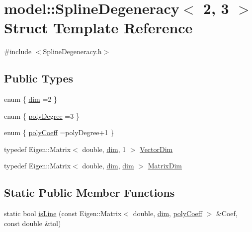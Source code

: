 \hypertarget{structmodel_1_1_spline_degeneracy_3_012_00_013_01_4}{}\section{model\+:\+:Spline\+Degeneracy$<$ 2, 3 $>$ Struct Template Reference}
\label{structmodel_1_1_spline_degeneracy_3_012_00_013_01_4}


{\ttfamily \#include $<$Spline\+Degeneracy.\+h$>$}

\subsection*{Public Types}
\begin{DoxyCompactItemize}
\item 
enum \{ \hyperlink{structmodel_1_1_spline_degeneracy_3_012_00_013_01_4_ab261b00b6647c6651df54f8b5782b963a854d40142847ac96977858cda94bc597}{dim} =2
 \}
\item 
enum \{ \hyperlink{structmodel_1_1_spline_degeneracy_3_012_00_013_01_4_abbd4d2928354009f5cbbaeef2e2c7752a86eb298928bd38a88853ded6be7e0500}{poly\+Degree} =3
 \}
\item 
enum \{ \hyperlink{structmodel_1_1_spline_degeneracy_3_012_00_013_01_4_a05a78943a17c7279ce89d5b2337dd467afffda36c7347df54c6eb741a1a83a465}{poly\+Coeff} =poly\+Degree+1
 \}
\item 
typedef Eigen\+::\+Matrix$<$ double, \hyperlink{structmodel_1_1_spline_degeneracy_3_012_00_013_01_4_ab261b00b6647c6651df54f8b5782b963a854d40142847ac96977858cda94bc597}{dim}, 1 $>$ \hyperlink{structmodel_1_1_spline_degeneracy_3_012_00_013_01_4_a57ac76273205b30ddcff84d77d3e5738}{Vector\+Dim}
\item 
typedef Eigen\+::\+Matrix$<$ double, \hyperlink{structmodel_1_1_spline_degeneracy_3_012_00_013_01_4_ab261b00b6647c6651df54f8b5782b963a854d40142847ac96977858cda94bc597}{dim}, \hyperlink{structmodel_1_1_spline_degeneracy_3_012_00_013_01_4_ab261b00b6647c6651df54f8b5782b963a854d40142847ac96977858cda94bc597}{dim} $>$ \hyperlink{structmodel_1_1_spline_degeneracy_3_012_00_013_01_4_afecd7765c4d18724c939c298569d0973}{Matrix\+Dim}
\end{DoxyCompactItemize}
\subsection*{Static Public Member Functions}
\begin{DoxyCompactItemize}
\item 
static bool \hyperlink{structmodel_1_1_spline_degeneracy_3_012_00_013_01_4_afbe13e14223e0cacef1d40dd5b8ca4ad}{is\+Line} (const Eigen\+::\+Matrix$<$ double, \hyperlink{structmodel_1_1_spline_degeneracy_3_012_00_013_01_4_ab261b00b6647c6651df54f8b5782b963a854d40142847ac96977858cda94bc597}{dim}, \hyperlink{structmodel_1_1_spline_degeneracy_3_012_00_013_01_4_a05a78943a17c7279ce89d5b2337dd467afffda36c7347df54c6eb741a1a83a465}{poly\+Coeff} $>$ \&Coef, const double \&tol)
\end{DoxyCompactItemize}


